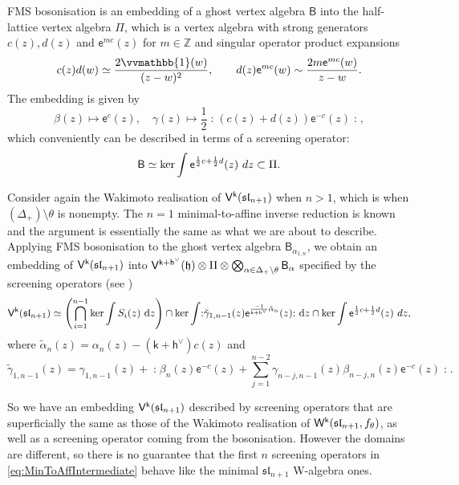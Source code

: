 \documentclass[10pt,a4paper]{amsart}
\numberwithin{equation}{section}
\renewcommand{\cong}{\simeq} %
\newcommand{\dd}{\mathrm{d}}   %
\newcommand{\ee}{\mathsf{e}}   %
\newcommand{\kk}{\mathsf{k}}   %
\newcommand{\wun}{\vvmathbb{1}}  %
\DeclarePairedDelimiter{\brac}{\lparen}{\rparen}   %
\newcommand{\no}[1]{\mathopen{:} #1 \mathclose{:}} %
\newcommand{\fld}[1]{\mathbb{#1}}    %
\newcommand{\alg}[1]{\mathfrak{#1}}  %
\newcommand{\VOA}[1]{\mathsf{#1}}    %
\newcommand{\ZZ}{\fld{Z}}
\newcommand{\SLA}[2]{\alg{#1}_{#2}}                      %
\newcommand{\slnpone}{\SLA{sl}{n+1}}
\newcommand{\cartan}{\mathfrak{h}}
\newcommand{\cox}{\mathsf{h}}                                        %
\newcommand{\dcox}{\coroot{\cox}}                                    %
\newcommand{\proots}{\Delta_+}                                       %
\newcommand{\sroot}[1]{\alpha_{#1}}                                  %
\newcommand{\tsroot}[1]{\tilde{\alpha}_{#1}}                         %
\newcommand{\hroot}{\theta}                                          %
\newcommand{\coroot}[1]{#1^{\vee}}                                   %
\newcommand{\fmin}{f_\theta}                                        %
\newcommand{\Wsymb}{\VOA{W}}
\newcommand{\uaffvoa}[2]{\VOA{V}^{#1}\brac{#2}}                   %
\newcommand{\bgvoa}{\VOA{B}}                                      %
\newcommand{\uQHR}[3]{\Wsymb^{#1}\brac{#2,#3}}                    %
\theoremstyle{plain}
\begin{document}
FMS bosonisation is an embedding of a ghost vertex algebra $\bgvoa$ into the half-lattice vertex algebra $\Pi$, which is a vertex algebra with strong generators $c(z), d(z)$ and $\ee^{m c}(z)$ for $m \in \ZZ$ and singular operator product expansions \cite{BerRep02}
%
\begin{equation}
    c(z) d(w) \cong \frac{2 \wun(w)}{(z-w)^2}, \qquad d(z) \ee^{m c}(w) \sim \frac{2m \ee^{m c}(w)}{z-w}.
\end{equation}
%
The embedding is given by
%
\begin{equation}
    \beta(z) \mapsto \ee^c(z), \quad \gamma(z) \mapsto \frac{1}{2}\no{\left(c(z)+d(z)\right) \ee^{-c}(z)},
\end{equation}
%
which conveniently can be described in terms of a screening operator:
%
\begin{equation}
    \bgvoa \cong \textup{ker} \int \ee^{\frac{1}{2}c + \frac{1}{2}d}(z) \ dz \subset \Pi.
\end{equation}

Consider again the Wakimoto realisation of $\uaffvoa{\kk}{\slnpone}$ when $n>1$, which is when $(\proots) \setminus \hroot$ is nonempty. The $n=1$ minimal-to-affine inverse reduction is known \cite{SemInv94,AdaRea17} and the argument is essentially the same as what we are about to describe. Applying FMS bosonisation to the ghost vertex algebra $\bgvoa_{\sroot{1,n}}$, we obtain an embedding of $\uaffvoa{\kk}{\slnpone}$ into $\uaffvoa{\kk+\dcox}{\cartan} \otimes \Pi \otimes \bigotimes_{\alpha \in \proots \setminus \hroot} \bgvoa_\alpha$ specified by the screening operators (see \cite[Sec.~3.1]{Feh21c})
%
\begin{equation} \label{eq:MinToAffIntermediate}
     \uaffvoa{\kk}{\slnpone} \cong \left( \bigcap_{i=1}^{n-1} \textup{ker} \int S_i(z) \ \dd z \right) \cap \textup{ker} \int \no{\tilde{\gamma}_{1,n-1}(z) \ee^{\frac{-1}{\kk+\dcox} \tsroot{n}}(z)} \ \dd z \cap  \textup{ker} \int \ee^{\frac{1}{2}c + \frac{1}{2}d}(z) \ dz,
\end{equation}
%
where $\tsroot{n}(z) = \sroot{n}(z)-(\kk+\dcox)c(z)$ and 
%
\begin{equation} \label{eq:FirstTildedField}
    \tilde{\gamma}_{1,n-1}(z) = \gamma_{1,n-1}(z) + \no{ \beta_n(z)\ee^{-c}(z) + \sum_{j=1}^{n-2} \gamma_{n-j,n-1}(z) \beta_{n-j,n}(z)\ee^{-c}(z)}.
\end{equation}

So we have an embedding $\uaffvoa{\kk}{\slnpone}$ described by screening operators that are superficially the same as those of the Wakimoto realisation of $\uQHR{\kk}{\slnpone}{\fmin}$, as well as a screening operator coming from the bosonisation. However the domains are different, so there is no guarantee that the first $n$ screening operators in \eqref{eq:MinToAffIntermediate} behave like the minimal $\slnpone$ W-algebra ones. 
\end{document}
